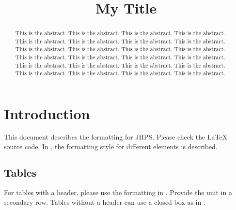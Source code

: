 \documentclass{jhps}
\begin{document}


\title{My Title}


\maketitle

\begin{abstract}
This is the abstract.
This is the abstract.
This is the abstract.
This is the abstract.
This is the abstract.
This is the abstract.
This is the abstract.
This is the abstract.
This is the abstract.
This is the abstract.
This is the abstract.
This is the abstract.
This is the abstract.
This is the abstract.
This is the abstract.
This is the abstract.
This is the abstract.
This is the abstract.
This is the abstract.
This is the abstract.
This is the abstract.
This is the abstract.
This is the abstract.
This is the abstract.
\end{abstract}

\section{Introduction}
\label{sec:intro}

This document describes the formatting for JHPS.
Please check the LaTeX source code.
In , the formatting style for different elements is described.

\subsection{Tables}

For tables with a header, please use the formatting in .
Provide the unit in a secondary row.
Tables without a header can use a closed box as in .
\end{document}
